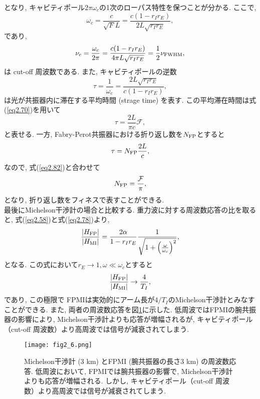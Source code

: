 となり, キャビティポール$2\pi\omega_c$の1次のローパス特性を保つことが分かる. ここで, 
\begin{equation}
\omega_c=\frac{c}{\sqrt{F}L}=\frac{c(1-r_Ir_E)}{2L\sqrt{r_Ir_E}},
\end{equation}
であり, 
\begin{equation}
\nu_c=\frac{\omega_c}{2\pi}=\frac{c(1-r_Ir_E)}{4\pi L\sqrt{r_Ir_E}}=\frac{1}{2}\nu_{\rm FWHM},
\end{equation}
は cut-off 周波数である. また, キャビティポールの逆数
\begin{equation}
\tau=\frac{1}{\omega_c}=\frac{2L\sqrt{r_Ir_E}}{c(1-r_Ir_E)},
\end{equation}
は光が共振器内に滞在する平均時間 (strage time) を表す. この平均滞在時間は式(\ref{eq2.70})を用いて
\begin{equation}
\tau=\frac{2L}{\pi c}\mathcal{F},
\label{eq2.82}
\end{equation}
と表せる. 一方, Fabry-Perot共振器における折り返し数を$N_{\rm FP}$とすると
\begin{equation}
\tau=N_{\rm FP}\frac{2L}{c},
\end{equation}
なので, 式(\ref{eq2.82})と合わせて
\begin{equation}
N_{\rm FP}=\frac{\mathcal{F}}{\pi},
\end{equation}
となり, 折り返し数をフィネスで表すことができる. \\
\quad 最後にMichelson干渉計の場合と比較する. 重力波に対する周波数応答の比を取ると, 式(\ref{eq2.58})と式(\ref{eq2.78})より, 
\begin{equation}
\frac{\left|H_{\rm FP}\right|}{\left|H_{\rm MI}\right|}=\frac{2\alpha}{1-r_Ir_E}\frac{1}{\sqrt{1+\left(\frac{\omega}{\omega_c}\right)^2}},
\end{equation}
となる. この式において$r_E\rightarrow 1,\omega\ll\omega_c$とすると
\begin{equation}
\frac{\left|H_{\rm FP}\right|}{\left|H_{\rm MI}\right|}\rightarrow\frac{4}{T_I},
\end{equation}
であり, この極限で FPMIは実効的にアーム長が$4/T_I$のMichelson干渉計とみなすことができる. また, 両者の周波数応答を図\ref{fig2.6}に示した. 低周波ではFPMIの腕共振器の影響により, Michelson干渉計よりも応答が増幅されるが, キャビティポール（cut-off 周波数）より高周波では信号が減衰されてしまう. 
\begin{figure}[H]
\begin{center}
\texttt{[image: fig2\_6.png]}
\caption[Michelson干渉計とFPMIの周波数応答]{Michelson干渉計 (3 km) とFPMI (腕共振器の長さ3 km) の周波数応答. 低周波において, FPMIでは腕共振器の影響で, Michelson干渉計よりも応答が増幅される. しかし, キャビティポール（cut-off 周波数）より高周波では信号が減衰されてしまう.  }
\label{fig2.6}
\end{center}
\end{figure}
